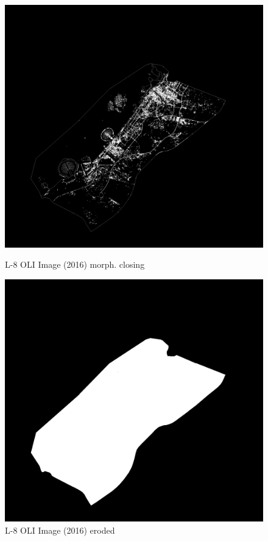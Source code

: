 \begin{figure}[h!]
\centering
\begin{minipage}{.5\textwidth}
	\centering
	\includegraphics[width=\textwidth-3em]{code/imagedata/analysis/street2016cropped_refd_close}
	\caption{L-8 OLI Image (2016) morph. closing}
	\label{fig:morphclose}
\end{minipage}%
\begin{minipage}{.5\textwidth}
	\centering
	\includegraphics[width=\textwidth-3em]{code/imagedata/analysis/street2016cropped_refd_erode}
	\caption{L-8 OLI Image (2016) eroded}
	\label{fig:morpherode}
\end{minipage}
\end{figure}

